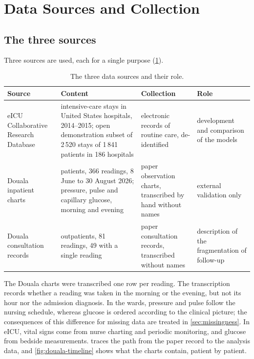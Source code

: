 \documentclass[11pt,a4paper,oneside]{report}
\begin{document}
\section{Data Sources and Collection}\label{sec:data-collection}\label{sec:collection}\label{sec:datasets}

\subsection{The three sources}

Three sources are used, each for a single purpose (\cref{tab:datasets}).

\begin{table}[htbp]
\centering\footnotesize
\caption{The three data sources and their role.}\label{tab:datasets}
\begin{tabularx}{\textwidth}{@{}>{\raggedright\arraybackslash}p{2.8cm} >{\raggedright\arraybackslash}X >{\raggedright\arraybackslash}p{3.0cm} >{\raggedright\arraybackslash}p{2.6cm}@{}}
\toprule
\textbf{Source} & \textbf{Content} & \textbf{Collection} & \textbf{Role} \\
\midrule
eICU Collaborative Research Database \parencite{pollard2018,eicudemo} & intensive-care stays in United States hospitals, 2014--2015; open demonstration subset of 2\,520 stays of 1\,841 patients in 186 hospitals & electronic records of routine care, de-identified & development and comparison of the models \\
Douala inpatient charts & 32 patients, 366 readings, 8 June to 30 August 2026; pressure, pulse and capillary glucose, morning and evening & paper observation charts, transcribed by hand without names & external validation only \\
Douala consultation records & 58 outpatients, 81 readings, 49 with a single reading & paper consultation records, transcribed without names & description of the fragmentation of follow-up \\
\bottomrule
\end{tabularx}
\end{table}

The Douala charts were transcribed one row per reading. The transcription records whether a reading was taken in the morning or the evening, but not its hour nor the admission diagnosis. In the wards, pressure and pulse follow the nursing schedule, whereas glucose is ordered according to the clinical picture; the consequences of this difference for missing data are treated in \cref{sec:missingness}. In eICU, vital signs come from nurse charting and periodic monitoring, and glucose from bedside measurements.  traces the path from the paper record to the analysis data, and \cref{fig:douala-timeline} shows what the charts contain, patient by patient.
\end{document}
